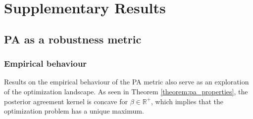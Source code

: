 \cleardoublepage


\chapter{Supplementary Results}\label{sec:appendix_results}

\section{PA as a robustness metric}\label{sec:appendix_results_pametric}

\subsection{Empirical behaviour}\label{subsec:appendix_empirical_behaviour}

Results on the empirical behaviour of the PA metric also serve as an exploration of
the optimization landscape. As seen in Theorem \ref{theorem:pa_properties}, the posterior agreement
kernel is concave for $\beta \in \mathbb{R}^+$, which implies that the optimization problem
has a unique maximum. 

